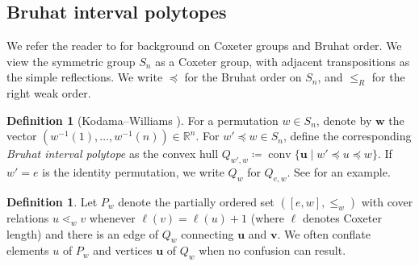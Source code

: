 \documentclass[12pt]{amsart}
\theoremstyle{plain}
\theoremstyle{definition}
\newtheorem{defn}[thm]{Definition}
\theoremstyle{remark}
\DeclareMathOperator{\conv}{conv}
\begin{document}
\subsection{Bruhat interval polytopes}

We refer the reader to \cite{BB} for background on Coxeter groups and Bruhat order. We view the symmetric group $S_n$ as a Coxeter group, with adjacent transpositions as the simple reflections. We write $\preceq$ for the Bruhat order on $S_n$, and $\leq_R$ for the right weak order.

\begin{defn}[Kodama--Williams \cite{KW}]
For a permutation $w \in S_n$, denote by $\mathbf{w}$ the vector $(w^{-1}(1),\ldots, w^{-1}(n)) \in \mathbb{R}^n$. For $w' \preceq w \in S_n$, define the corresponding \emph{Bruhat interval polytope} as the convex hull $Q_{w',w}\coloneqq \conv \{ \mathbf{u} \mid w' \preceq u \preceq w\}$. If $w'=e$ is the identity permutation, we write $Q_w$ for $Q_{e,w}$. See  for an example.
\end{defn}


\begin{defn}
Let $P_w$ denote the partially ordered set $([e,w], \leq_w)$ with cover relations $u \lessdot_w v$ whenever $\ell(v)=\ell(u)+1$ (where $\ell$ denotes Coxeter length) and there is an edge of $Q_w$ connecting $\mathbf{u}$ and $\mathbf{v}$. We often conflate elements $u$ of $P_w$ and vertices $\mathbf{u}$ of $Q_w$ when no confusion can result.
\end{defn}
\end{document}
